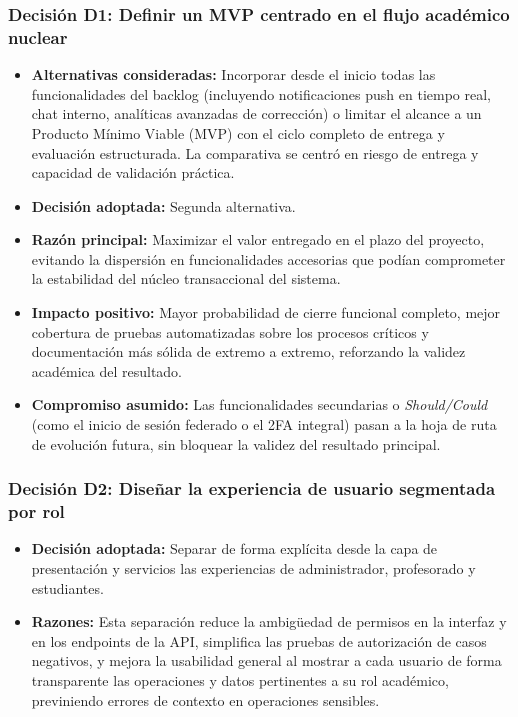 \subsubsection*{Decisi\'on D1: Definir un MVP centrado en el flujo acad\'emico nuclear}
\begin{itemize}
    \item \textbf{Alternativas consideradas:} Incorporar desde el inicio todas las funcionalidades del backlog (incluyendo notificaciones push en tiempo real, chat interno, anal\'iticas avanzadas de correcci\'on) o limitar el alcance a un Producto M\'inimo Viable (MVP) con el ciclo completo de entrega y evaluaci\'on estructurada. La comparativa se centr\'o en riesgo de entrega y capacidad de validaci\'on pr\'actica.
    \item \textbf{Decisi\'on adoptada:} Segunda alternativa.
    \item \textbf{Raz\'on principal:} Maximizar el valor entregado en el plazo del proyecto, evitando la dispersi\'on en funcionalidades accesorias que pod\'ian comprometer la estabilidad del n\'ucleo transaccional del sistema.
    \item \textbf{Impacto positivo:} Mayor probabilidad de cierre funcional completo, mejor cobertura de pruebas automatizadas sobre los procesos cr\'iticos y documentaci\'on m\'as s\'olida de extremo a extremo, reforzando la validez acad\'emica del resultado.
    \item \textbf{Compromiso asumido:} Las funcionalidades secundarias o \emph{Should/Could} (como el inicio de sesi\'on federado o el 2FA integral) pasan a la hoja de ruta de evoluci\'on futura, sin bloquear la validez del resultado principal.
\end{itemize}

\subsubsection*{Decisi\'on D2: Dise\~nar la experiencia de usuario segmentada por rol}
\begin{itemize}
    \item \textbf{Decisi\'on adoptada:} Separar de forma expl\'icita desde la capa de presentaci\'on y servicios las experiencias de administrador, profesorado y estudiantes.
    \item \textbf{Razones:} Esta separaci\'on reduce la ambig\"uedad de permisos en la interfaz y en los endpoints de la API, simplifica las pruebas de autorizaci\'on de casos negativos, y mejora la usabilidad general al mostrar a cada usuario de forma transparente las operaciones y datos pertinentes a su rol acad\'emico, previniendo errores de contexto en operaciones sensibles.
\end{itemize}

